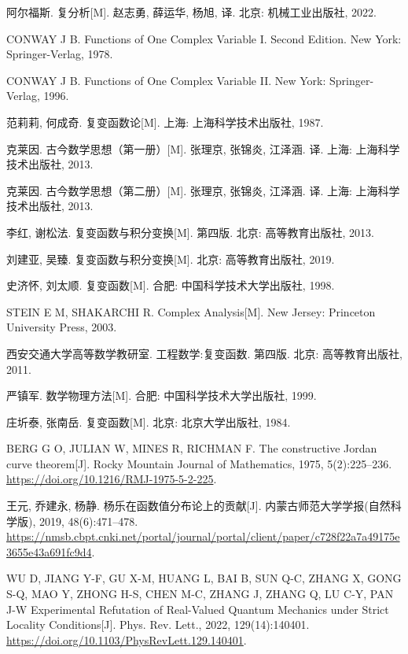 \begin{thebibliography}{99}
	阿尔福斯.
	复分析[M].
	赵志勇, 薛运华, 杨旭, 译.
	北京: 机械工业出版社, 2022.

	CONWAY J B.
	Functions of One Complex Variable I.
	Second Edition.
	New York: Springer-Verlag, 1978.

	CONWAY J B.
	Functions of One Complex Variable II.
	New York: Springer-Verlag, 1996.

	范莉莉, 何成奇.
	复变函数论[M].
	上海: 上海科学技术出版社, 1987.

	克莱因.
	古今数学思想（第一册）[M].
	张理京, 张锦炎, 江泽涵. 译.
	上海: 上海科学技术出版社, 2013.

	克莱因.
	古今数学思想（第二册）[M].
	张理京, 张锦炎, 江泽涵. 译.
	上海: 上海科学技术出版社, 2013.

	李红, 谢松法.
	复变函数与积分变换[M].
	第四版.
	北京: 高等教育出版社, 2013.

	刘建亚, 吴臻.
	复变函数与积分变换[M].
	北京: 高等教育出版社, 2019.
	
	史济怀, 刘太顺.
	复变函数[M].
	合肥: 中国科学技术大学出版社, 1998.
	
	STEIN E M, SHAKARCHI R.
	Complex Analysis[M].
	New Jersey: Princeton University Press, 2003.

	西安交通大学高等数学教研室.
	工程数学:复变函数.
	第四版.
	北京: 高等教育出版社, 2011.

	严镇军.
	数学物理方法[M].
	合肥: 中国科学技术大学出版社, 1999.

	庄圻泰, 张南岳.
	复变函数[M].
	北京: 北京大学出版社, 1984.

	BERG G O, JULIAN W, MINES R, RICHMAN F.
	The constructive Jordan curve theorem[J].
	Rocky Mountain Journal of Mathematics, 1975, 5(2):225--236.
	\url{https://doi.org/10.1216/RMJ-1975-5-2-225}.

	王元, 乔建永, 杨静.
	杨乐在函数值分布论上的贡献[J].
	内蒙古师范大学学报(自然科学版), 2019, 48(6):471--478.
	\url{https://nmsb.cbpt.cnki.net/portal/journal/portal/client/paper/c728f22a7a49175e3655e43a691fc9d4}.

	WU D,
	JIANG Y-F,
	GU X-M,
	HUANG L,
	BAI B,
	SUN Q-C,
	ZHANG X,
	GONG S-Q,
	MAO Y,
	ZHONG H-S,
	CHEN M-C,
	ZHANG J,
	ZHANG Q,
	LU C-Y,
	PAN J-W
	Experimental Refutation of Real-Valued Quantum Mechanics under Strict Locality Conditions[J].
	Phys. Rev. Lett., 2022, 129(14):140401.
	\url{https://doi.org/10.1103/PhysRevLett.129.140401}.


\end{thebibliography}
